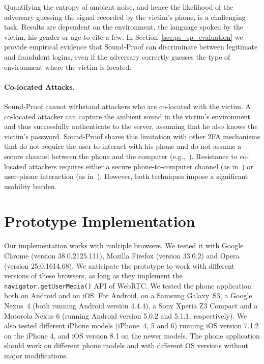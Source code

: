 Quantifying the entropy of ambient noise, and hence the likelihood of the adversary guessing the signal recorded by the victim's phone, is a challenging task.
Results are dependent on the environment, the language spoken by the victim, his gender or age to cite a few.
In Section~\ref{sec:ps_sp_evaluation} we provide empirical evidence that Sound-Proof can discriminate between legitimate and fraudulent logins, even if the adversary correctly guesses the type of environment where the victim is located.

\paragraph{Co-located Attacks.} Sound-Proof cannot withstand attackers who are co-located with the victim. A co-located attacker can capture the ambient sound in the victim's environment and thus successfully authenticate to the server, assuming that he also knows the victim's password. Sound-Proof shares this limitation with other 2FA mechanisms that do not require the user to interact with his phone and do not assume a secure channel between the phone and the computer (e.g.,~\cite{czeskis12ccs}).
Resistance to co-located attackers requires either a secure phone-to-computer channel (as in~\cite{authy,shirvanian14}) or user-phone interaction (as in~\cite{duosecurity,google_authentication}).
However, both techniques impose a significant usability burden.

\section{Prototype Implementation}
\label{sec:ps_sp_implementation}

Our implementation works with multiple browsers. We tested it with Google Chrome (version 38.0.2125.111), Mozilla Firefox (version 33.0.2) and Opera (version 25.0.1614.68).
We anticipate the prototype to work with different versions of these browsers, as long as they implement the \texttt{navigator.getUserMedia()} API of WebRTC.
We tested the phone application both on Android and on iOS. For Android, on a Samsung Galaxy~S3, a Google Nexus~4 (both running Android version 4.4.4), a Sony Xperia Z3 Compact and a Motorola Nexus 6 (running Android version 5.0.2 and 5.1.1, respectively).
We also tested different iPhone models (iPhone~4, 5 and 6) running iOS version 7.1.2 on the iPhone 4, and iOS version 8.1 on the newer models.
The phone application should work on different phone models and with different OS versions without major modifications.


